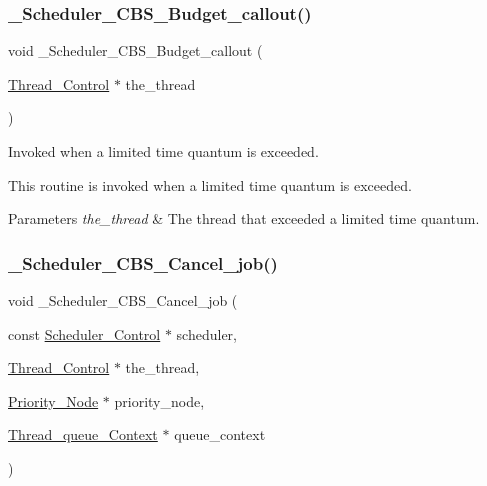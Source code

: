 \subsubsection{\texorpdfstring{\_Scheduler\_CBS\_Budget\_callout()}{\_Scheduler\_CBS\_Budget\_callout()}}
{\footnotesize\ttfamily void \+\_\+\+Scheduler\+\_\+\+C\+B\+S\+\_\+\+Budget\+\_\+callout (\begin{DoxyParamCaption}\item[{\mbox{\hyperlink{struct__Thread__Control}{Thread\+\_\+\+Control}} $\ast$}]{the\+\_\+thread }\end{DoxyParamCaption})}



Invoked when a limited time quantum is exceeded. 

This routine is invoked when a limited time quantum is exceeded.


\begin{DoxyParams}{Parameters}
{\em the\+\_\+thread} & The thread that exceeded a limited time quantum. \\
\hline
\end{DoxyParams}
\mbox{\label{group__RTEMSScoreSchedulerCBS_gaa7df4531e6a166ebebde6355dba251a6}} 
\subsubsection{\texorpdfstring{\_Scheduler\_CBS\_Cancel\_job()}{\_Scheduler\_CBS\_Cancel\_job()}}
{\footnotesize\ttfamily void \+\_\+\+Scheduler\+\_\+\+C\+B\+S\+\_\+\+Cancel\+\_\+job (\begin{DoxyParamCaption}\item[{const \mbox{\hyperlink{struct__Scheduler__Control}{Scheduler\+\_\+\+Control}} $\ast$}]{scheduler,  }\item[{\mbox{\hyperlink{struct__Thread__Control}{Thread\+\_\+\+Control}} $\ast$}]{the\+\_\+thread,  }\item[{\mbox{\hyperlink{structPriority__Node}{Priority\+\_\+\+Node}} $\ast$}]{priority\+\_\+node,  }\item[{\mbox{\hyperlink{structThread__queue__Context}{Thread\+\_\+queue\+\_\+\+Context}} $\ast$}]{queue\+\_\+context }\end{DoxyParamCaption})}



